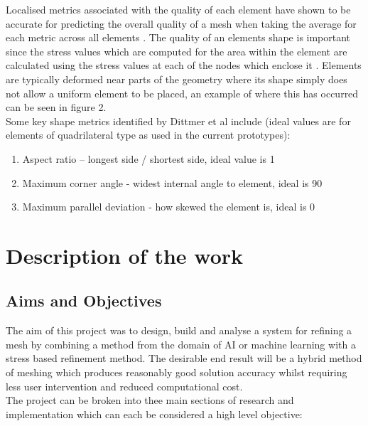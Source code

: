 \documentclass{article}
\begin{document}
\noindent
Localised metrics associated with the quality of each element have shown to be accurate for predicting the overall quality of a mesh when taking the average for each metric across all elements \cite{DittmerMeshQualityMet}. The quality of an elements shape is important since the stress values which are computed for the area within the element are calculated using the stress values at each of the nodes which enclose it \cite{IntroductionToFE}. Elements are typically deformed near parts of the geometry where its shape simply does not allow a uniform element to be placed, an example of where this has occurred can be seen in figure 2.\\ 

\noindent
Some key shape metrics identified by Dittmer et al include (ideal values are for elements of quadrilateral type as used in  the current prototypes):

\begin{enumerate}[label=\Alph*]
\item Aspect ratio – longest side / shortest side, ideal value is 1
\item Maximum corner angle - widest internal angle to element, ideal is 90\degree
\item Maximum parallel deviation - how skewed the element is, ideal is 0\degree
\end{enumerate}

\section{Description of the work}
\subsection{Aims and Objectives}
The aim of this project was to design, build and analyse a system for refining a mesh by combining a method from the domain of AI or machine learning with a stress based refinement method. The desirable end result will be a hybrid method of meshing which produces reasonably good solution accuracy whilst requiring less user intervention and reduced computational cost.\\

\noindent
The project can be broken into thee main sections of research and implementation which can each be considered a high level objective:\\ 
\end{document}
